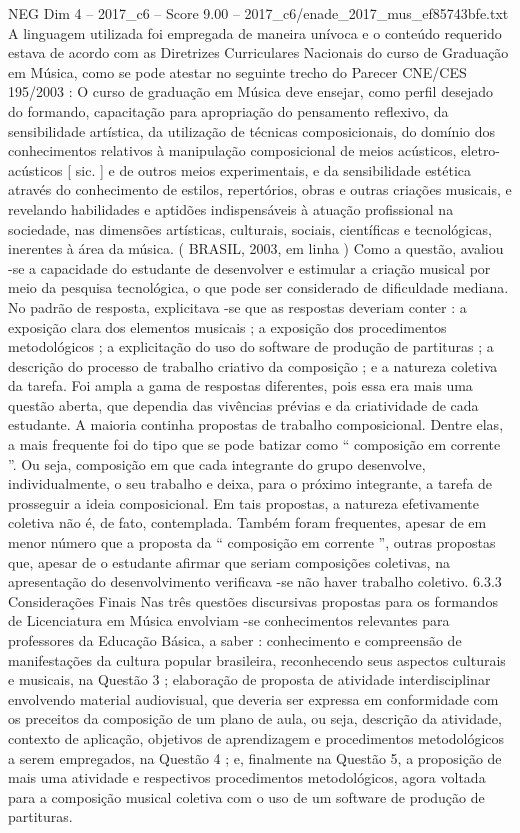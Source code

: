 \begin{textsample}{NEG Dim 4 – 2017\_c6 – Score 9.00 – 2017\_c6/enade\_2017\_mus\_ef85743bfe.txt}
A linguagem utilizada foi empregada de maneira unívoca e o conteúdo requerido estava de acordo com as Diretrizes Curriculares Nacionais do curso de Graduação em Música, como se pode atestar no seguinte trecho do Parecer CNE/CES 195/2003 : O curso de graduação em Música deve ensejar, como perfil desejado do formando, capacitação para apropriação do pensamento reflexivo, da sensibilidade artística, da utilização de técnicas composicionais, do domínio dos conhecimentos relativos à manipulação composicional de meios acústicos, eletro-acústicos [ sic. ] e de outros meios experimentais, e da sensibilidade estética através do conhecimento de estilos, repertórios, obras e outras criações musicais, e revelando habilidades e aptidões indispensáveis à atuação profissional na sociedade, nas dimensões artísticas, culturais, sociais, científicas e tecnológicas, inerentes à área da música. ( BRASIL, 2003, em linha ) Como a questão, avaliou -se a capacidade do estudante de desenvolver e estimular a criação musical por meio da pesquisa tecnológica, o que pode ser considerado de dificuldade mediana.
No padrão de resposta, explicitava -se que as respostas deveriam conter : a exposição clara dos elementos musicais ; a exposição dos procedimentos metodológicos ; a explicitação do uso do software de produção de partituras ; a descrição do processo de trabalho criativo da composição ; e a natureza coletiva da tarefa.
Foi ampla a gama de respostas diferentes, pois essa era mais uma questão aberta, que dependia das vivências prévias e da criatividade de cada estudante.
A maioria continha propostas de trabalho composicional.
Dentre elas, a mais frequente foi do tipo que se pode batizar como “ composição em corrente ”.
Ou seja, composição em que cada integrante do grupo desenvolve, individualmente, o seu trabalho e deixa, para o próximo integrante, a tarefa de prosseguir a ideia composicional.
Em tais propostas, a natureza efetivamente coletiva não é, de fato, contemplada.
Também foram frequentes, apesar de em menor número que a proposta da “ composição em corrente ”, outras propostas que, apesar de o estudante afirmar que seriam composições coletivas, na apresentação do desenvolvimento verificava -se não haver trabalho coletivo. 6.3.3 Considerações Finais Nas três questões discursivas propostas para os formandos de Licenciatura em Música envolviam -se conhecimentos relevantes para professores da Educação Básica, a saber : conhecimento e compreensão de manifestações da cultura popular brasileira, reconhecendo seus aspectos culturais e musicais, na Questão 3 ; elaboração de proposta de atividade interdisciplinar envolvendo material audiovisual, que deveria ser expressa em conformidade com os preceitos da composição de um plano de aula, ou seja, descrição da atividade, contexto de aplicação, objetivos de aprendizagem e procedimentos metodológicos a serem empregados, na Questão 4 ; e, finalmente na Questão 5, a proposição de mais uma atividade e respectivos procedimentos metodológicos, agora voltada para a composição musical coletiva com o uso de um software de produção de partituras.

\end{textsample}
